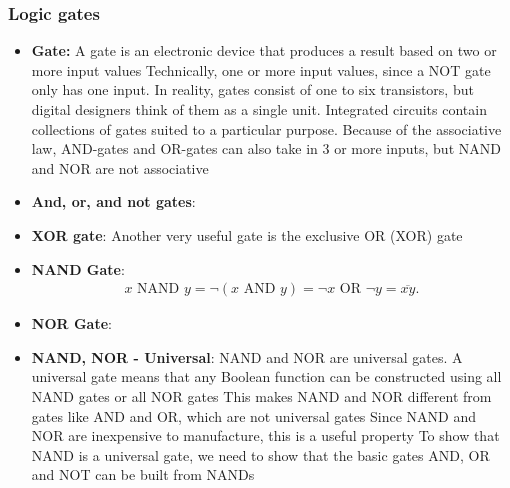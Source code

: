 \documentclass{report}
\begin{document}
    \subsubsection{Logic gates}
    \begin{itemize}
        \item \textbf{Gate:} A gate is an electronic device that produces a result based on two or more input values
            \bigbreak \noindent 
            Technically, one or more input values, since a NOT gate only has one input.
            \bigbreak \noindent 
            In reality, gates consist of one to six transistors, but digital designers think of them as a single unit.
            \bigbreak \noindent 
            Integrated circuits contain collections of gates suited to a particular purpose.
            \bigbreak \noindent 
            Because of the associative law, AND-gates and OR-gates can also take in 3 or more inputs, but NAND and NOR are not associative
        \item \textbf{And, or, and not gates}:
            \bigbreak \noindent 
            \bigbreak \noindent 
        \item \textbf{XOR gate}: Another very useful gate is the exclusive OR (XOR) gate
            \bigbreak \noindent 
        \item \textbf{NAND Gate}:
            \bigbreak \noindent 
            \begin{align*}
                x \text{ NAND } y = \neg (x \text{ AND } y) = \neg x \text{ OR } \neg y = \overline{xy}
            .\end{align*}
        \item \textbf{NOR Gate}:
            \bigbreak \noindent 
        \item \textbf{NAND, NOR - Universal}: NAND and NOR are universal gates.
            \bigbreak \noindent 
            A universal gate means that any Boolean function can be constructed using all NAND gates or all NOR gates
            \bigbreak \noindent 
            This makes NAND and NOR different from gates like AND and OR, which are not universal gates
            \bigbreak \noindent 
            Since NAND and NOR are inexpensive to manufacture, this is a useful property
            \bigbreak \noindent 
            To show that NAND is a universal gate, we need to show that the basic gates AND, OR and NOT can be built from NANDs

\end{itemize}
\end{document}
